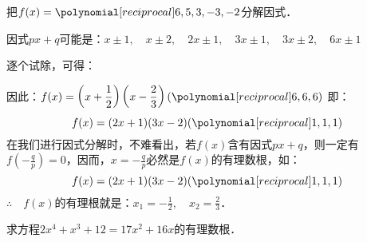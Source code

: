 \begin{example}
把$f(x)=\poly{6,5,3,-3,-2}$分解因式．
\end{example}

\begin{solution}
因式$px+q$可能是：$x\pm 1,\quad x\pm 2,\quad 2x\pm 1,\quad 3x\pm 1,\quad 3x\pm 2,\quad 6x\pm 1$

逐个试除，可得：
\begin{center}
\end{center}

因此：$f(x)=\left(x+\frac{1}{2}\right)\left(x-\frac{2}{3}\right)(\poly{6,6,6})$
即：
\[f(x)=(2x+1)(3x-2)(\poly{1,1,1})\]
在我们进行因式分解时，不难看出，若$f(x)$含有因式$px+q$，则一定有$f\left(-\frac{q}{p}\right)=0$，因而，$x=-\frac{q}{p}$必然是$f(x)$的有理数根，如：
\[f(x)=(2x+1)(3x-2)(\poly{1,1,1})\]
$\therefore\quad f(x)$的有理根就是：$x_1=-\frac{1}{2},\quad x_2=\frac{2}{3}$．
\end{solution}


\begin{example}
    求方程$2x^4+x^3+12=17x^2+16x$的有理数根．
\end{example}


